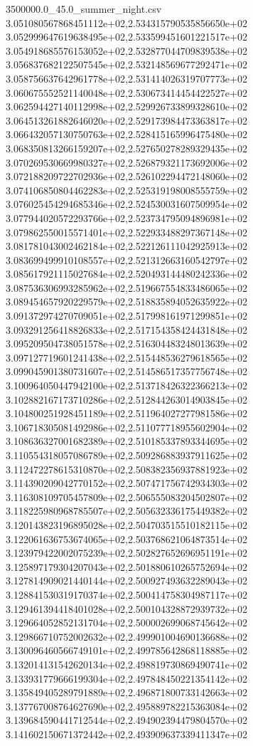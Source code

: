 \begin{filecontents*}{3500000.0_45.0_summer_night.csv}
3.051080567868451112e+02,2.534315790535856650e+02
3.052999647619638495e+02,2.533599451601221517e+02
3.054918685576153052e+02,2.532877044709839538e+02
3.056837682122507545e+02,2.532148569677292471e+02
3.058756637642961778e+02,2.531414026319707773e+02
3.060675552521140048e+02,2.530673414454422527e+02
3.062594427140112998e+02,2.529926733899328610e+02
3.064513261882646020e+02,2.529173984473363817e+02
3.066432057130750763e+02,2.528415165996475480e+02
3.068350813266159207e+02,2.527650278289329435e+02
3.070269530669980327e+02,2.526879321173692006e+02
3.072188209722702936e+02,2.526102294472148060e+02
3.074106850804462283e+02,2.525319198008555759e+02
3.076025454294685346e+02,2.524530031607509954e+02
3.077944020572293766e+02,2.523734795094896981e+02
3.079862550015571401e+02,2.522933488297367148e+02
3.081781043002462184e+02,2.522126111042925913e+02
3.083699499910108557e+02,2.521312663160542797e+02
3.085617921115027684e+02,2.520493144480242336e+02
3.087536306993285962e+02,2.519667554833486065e+02
3.089454657920229579e+02,2.518835894052635922e+02
3.091372974270709051e+02,2.517998161971299851e+02
3.093291256418826833e+02,2.517154358424431848e+02
3.095209504738051578e+02,2.516304483248013639e+02
3.097127719601241438e+02,2.515448536279618565e+02
3.099045901380731607e+02,2.514586517357756748e+02
3.100964050447942100e+02,2.513718426322366213e+02
3.102882167173710286e+02,2.512844263014903845e+02
3.104800251928451189e+02,2.511964027277981586e+02
3.106718305081492986e+02,2.511077718955602904e+02
3.108636327001682389e+02,2.510185337893344695e+02
3.110554318057086789e+02,2.509286883937911625e+02
3.112472278615310870e+02,2.508382356937881923e+02
3.114390209042770152e+02,2.507471756742934303e+02
3.116308109705457809e+02,2.506555083204502807e+02
3.118225980968785507e+02,2.505632336175449382e+02
3.120143823196895028e+02,2.504703515510182115e+02
3.122061636753674065e+02,2.503768621064873514e+02
3.123979422002075239e+02,2.502827652696951191e+02
3.125897179304207043e+02,2.501880610265752694e+02
3.127814909021440144e+02,2.500927493632289043e+02
3.128841530319170374e+02,2.500414758304987117e+02
3.129461394418401028e+02,2.500104328872939732e+02
3.129664052852131704e+02,2.500002699068745642e+02
3.129866710752002632e+02,2.499901004690136688e+02
3.130096460566749101e+02,2.499785642868118885e+02
3.132014131542620134e+02,2.498819730869490741e+02
3.133931779666199304e+02,2.497848450221354142e+02
3.135849405289791889e+02,2.496871800733142663e+02
3.137767008764627690e+02,2.495889782215363084e+02
3.139684590441712544e+02,2.494902394479804570e+02
3.141602150671372442e+02,2.493909637339411347e+02

\end{filecontents*}
